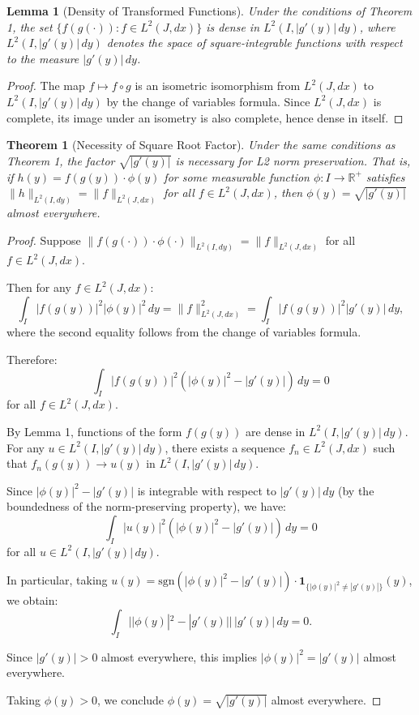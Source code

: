 \documentclass{article}
\newtheorem{theorem}{Theorem}
\newtheorem{lemma}{Lemma}
\begin{document}
\begin{lemma}[Density of Transformed Functions]
Under the conditions of Theorem 1, the set $\{f(g(\cdot)) : f \in L^2(J, dx)\}$ is dense in $L^2(I, |g'(y)| \, dy)$, where $L^2(I, |g'(y)| \, dy)$ denotes the space of square-integrable functions with respect to the measure $|g'(y)| \, dy$.
\end{lemma}

\begin{proof}
The map $f \mapsto f \circ g$ is an isometric isomorphism from $L^2(J, dx)$ to $L^2(I, |g'(y)| \, dy)$ by the change of variables formula. Since $L^2(J, dx)$ is complete, its image under an isometry is also complete, hence dense in itself.
\end{proof}

\begin{theorem}[Necessity of Square Root Factor]
Under the same conditions as Theorem 1, the factor $\sqrt{|g'(y)|}$ is necessary for L2 norm preservation. That is, if $h(y) = f(g(y)) \cdot \phi(y)$ for some measurable function $\phi: I \to \mathbb{R}^+$ satisfies $\|h\|_{L^2(I, dy)} = \|f\|_{L^2(J, dx)}$ for all $f \in L^2(J, dx)$, then $\phi(y) = \sqrt{|g'(y)|}$ almost everywhere.
\end{theorem}

\begin{proof}
Suppose $\|f(g(\cdot)) \cdot \phi(\cdot)\|_{L^2(I, dy)} = \|f\|_{L^2(J, dx)}$ for all $f \in L^2(J, dx)$.

Then for any $f \in L^2(J, dx)$:
$$\int_I |f(g(y))|^2 |\phi(y)|^2 \, dy = \|f\|_{L^2(J, dx)}^2 = \int_I |f(g(y))|^2 |g'(y)| \, dy,$$
where the second equality follows from the change of variables formula.

Therefore:
$$\int_I |f(g(y))|^2 (|\phi(y)|^2 - |g'(y)|) \, dy = 0$$
for all $f \in L^2(J, dx)$.

By Lemma 1, functions of the form $f(g(y))$ are dense in $L^2(I, |g'(y)| \, dy)$. For any $u \in L^2(I, |g'(y)| \, dy)$, there exists a sequence $f_n \in L^2(J, dx)$ such that $f_n(g(y)) \to u(y)$ in $L^2(I, |g'(y)| \, dy)$.

Since $|\phi(y)|^2 - |g'(y)|$ is integrable with respect to $|g'(y)| \, dy$ (by the boundedness of the norm-preserving property), we have:
$$\int_I |u(y)|^2 (|\phi(y)|^2 - |g'(y)|) \, dy = 0$$
for all $u \in L^2(I, |g'(y)| \, dy)$.

In particular, taking $u(y) = \text{sgn}(|\phi(y)|^2 - |g'(y)|) \cdot \mathbf{1}_{\{|\phi(y)|^2 \neq |g'(y)|\}}(y)$, we obtain:
$$\int_I ||\phi(y)|^2 - |g'(y)|| \, |g'(y)| \, dy = 0.$$

Since $|g'(y)| > 0$ almost everywhere, this implies $|\phi(y)|^2 = |g'(y)|$ almost everywhere.

Taking $\phi(y) > 0$, we conclude $\phi(y) = \sqrt{|g'(y)|}$ almost everywhere.
\end{proof}
\end{document}
